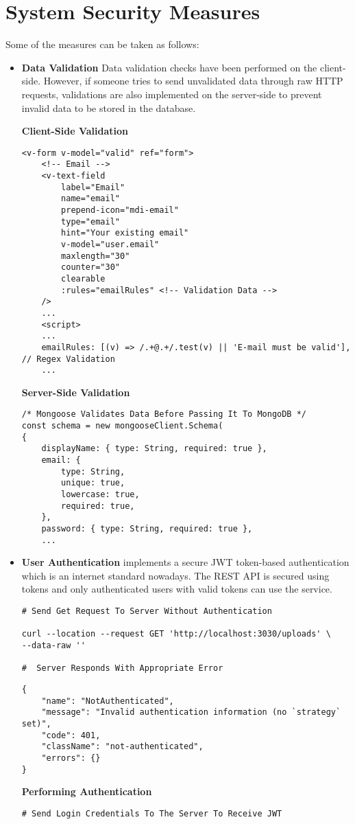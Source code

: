 		\section{System Security Measures}	
		\vs
		Some of the measures can be taken as follows:
		\begin{itemize}
			\item 
			\textbf{\large Data Validation}
			\vs
			 Data validation checks have been performed on the client-side. However, if someone tries to send unvalidated data through raw HTTP requests, validations are also implemented on the server-side to prevent invalid data to be stored in the database.
			 
\vs
\textbf{\small Client-Side Validation}
\vs
\begin{verbatim}
<v-form v-model="valid" ref="form">
	<!-- Email -->
	<v-text-field
		label="Email"
		name="email"
		prepend-icon="mdi-email"
		type="email"
		hint="Your existing email" 
		v-model="user.email"
		maxlength="30"
		counter="30"
		clearable
		:rules="emailRules" <!-- Validation Data -->
	/>
	...
	<script>
	...
	emailRules: [(v) => /.+@.+/.test(v) || 'E-mail must be valid'], // Regex Validation
	...
\end{verbatim}
\vs
\textbf{\small Server-Side Validation}
\vs
\begin{verbatim}
/* Mongoose Validates Data Before Passing It To MongoDB */
const schema = new mongooseClient.Schema( 
{
	displayName: { type: String, required: true },
	email: {
		type: String,
		unique: true,
		lowercase: true,
		required: true,
	},
	password: { type: String, required: true },
	...
\end{verbatim}
\item 
\textbf{\large User Authentication}
\vs
\projectname\space implements a secure JWT token-based authentication which is an internet standard nowadays. The REST API is secured using tokens and only authenticated users with valid tokens can use the service.
\vs
\begin{verbatim}
# Send Get Request To Server Without Authentication

curl --location --request GET 'http://localhost:3030/uploads' \
--data-raw ''

#  Server Responds With Appropriate Error
\end{verbatim}
\begin{verbatim}
{
	"name": "NotAuthenticated",
	"message": "Invalid authentication information (no `strategy` set)",
	"code": 401,
	"className": "not-authenticated",
	"errors": {}
}
\end{verbatim}
\textbf{\small Performing Authentication}
\begin{verbatim}
# Send Login Credentials To The Server To Receive JWT


\end{verbatim}
\end{itemize}
